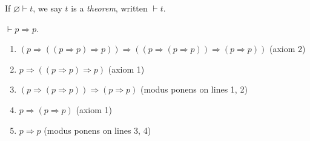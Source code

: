 \begin{definition}
    If \( \varnothing \vdash t \), we say \( t \) is a \emph{theorem}, written \( \vdash t \).
\end{definition}
\begin{example}
    \( \vdash p \Rightarrow p \).
    \begin{enumerate}[1.]
        \item \( (p \Rightarrow ((p \Rightarrow p) \Rightarrow p)) \Rightarrow ((p \Rightarrow (p \Rightarrow p)) \Rightarrow (p \Rightarrow p)) \) (axiom 2)
        \item \( p \Rightarrow ((p \Rightarrow p) \Rightarrow p) \) (axiom 1)
        \item \( (p \Rightarrow (p \Rightarrow p)) \Rightarrow (p \Rightarrow p) \) (modus ponens on lines 1, 2)
        \item \( p \Rightarrow (p \Rightarrow p) \) (axiom 1)
        \item \( p \Rightarrow p \) (modus ponens on lines 3, 4)
    \end{enumerate}
\end{example}

